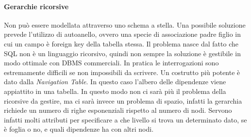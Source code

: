 \paragraph{Gerarchie ricorsive}
Non può essere modellata attraverso uno schema a stella.
Una possibile soluzione prevede l'utilizzo di autoanello, ovvero una specie di associazione padre figlio in cui un campo è foreign key della tabella stessa.\newline
Il problema nasce dal fatto che SQL non è un linguaggio ricorsivo, quindi non sempre la soluzione è gestibile in modo ottimale con DBMS commerciali. In pratica le interrogazioni sono estremamente difficili se non impossibili da scrivere.\newline
Un costrutto più potente è dato dalla \textit{Navigation Table}.
\noindent In questo caso l'albero delle dipendenze viene appiattito in una tabella. In questo modo non ci sarà più il problema della ricorsive da gestire, ma ci sarà invece un problema di spazio, infatti la gerarchia richiede un numero di righe esponenziali rispetto al numero di nodi.\newline
Servono infatti molti attributi per specificare a che livello si trova un determinato dato, se è foglia o no, e quali dipendenze ha con altri nodi.


